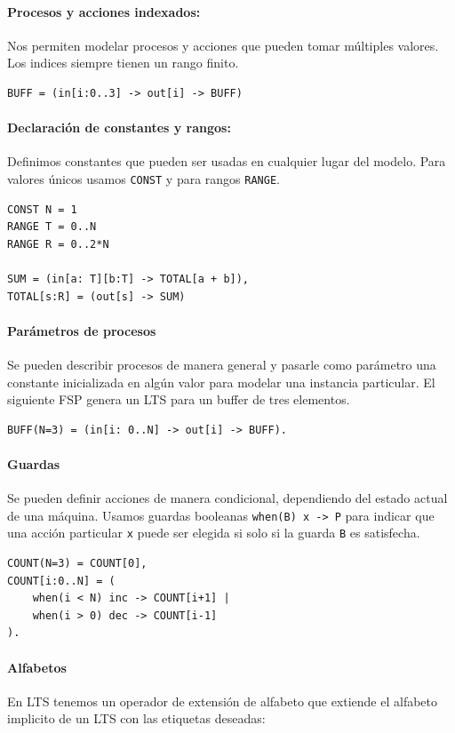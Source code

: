 \paragraph{Procesos y acciones indexados:} Nos permiten modelar procesos y acciones que pueden tomar múltiples valores. Los indices siempre tienen un rango finito.

\begin{verbatim}
BUFF = (in[i:0..3] -> out[i] -> BUFF)
\end{verbatim}

\paragraph{Declaración de constantes y rangos:} 
Definimos constantes que pueden ser usadas en cualquier lugar del modelo. Para valores únicos usamos \texttt{CONST} y para rangos \texttt{RANGE}.
\begin{verbatim}
CONST N = 1
RANGE T = 0..N
RANGE R = 0..2*N

SUM = (in[a: T][b:T] -> TOTAL[a + b]),
TOTAL[s:R] = (out[s] -> SUM)
\end{verbatim}

\paragraph{Parámetros de procesos}
Se pueden describir procesos de manera general y pasarle como parámetro una constante inicializada en algún valor para modelar una instancia particular.
El siguiente FSP genera un LTS para un buffer de tres elementos.
\begin{verbatim}
BUFF(N=3) = (in[i: 0..N] -> out[i] -> BUFF).
\end{verbatim}

\paragraph{Guardas}
Se pueden definir acciones de manera condicional, dependiendo del estado actual de una máquina. Usamos guardas booleanas \texttt{when(B) x -> P} para indicar que una acción particular \texttt{x} puede ser elegida si solo si la guarda \texttt{B} es satisfecha.

\begin{verbatim}
COUNT(N=3) = COUNT[0],
COUNT[i:0..N] = (
    when(i < N) inc -> COUNT[i+1] |
    when(i > 0) dec -> COUNT[i-1]
).
\end{verbatim}

\paragraph{Alfabetos}
En LTS tenemos un operador de extensión de alfabeto que extiende el alfabeto implicito de un LTS con las etiquetas deseadas:

